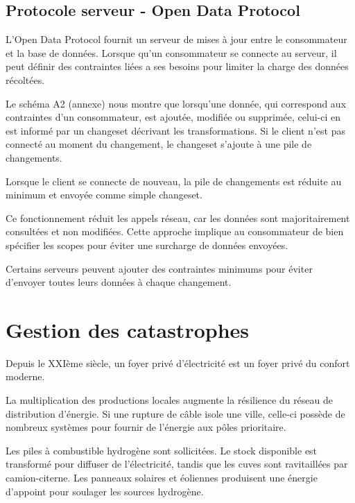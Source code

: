 \subsection{Protocole serveur - Open Data Protocol}

L'Open Data Protocol fournit un serveur de mises à jour entre le consommateur et la base de données.
Lorsque qu'un consommateur se connecte au serveur, il peut définir des contraintes liées a ses besoins
pour limiter la charge des données récoltées.

Le schéma A2 (annexe) nous montre que lorsqu'une donnée, qui correspond aux contraintes d'un consommateur, est ajoutée, modifiée ou supprimée,
celui-ci en est informé par un changeset décrivant les transformations.
Si le client n'est pas connecté au moment du changement, le changeset s'ajoute à une pile
de changements.

Lorsque le client se connecte de nouveau, la pile de changements est réduite au minimum et envoyée
comme simple changeset.

Ce fonctionnement réduit les appels réseau, car les données sont majoritairement consultées et non modifiées.
Cette approche implique au consommateur de bien spécifier les scopes pour éviter une surcharge de données
envoyées.

Certains serveurs peuvent ajouter des contraintes minimums pour éviter d'envoyer toutes leurs données
à chaque changement.



\section{Gestion des catastrophes}

Depuis le XXIème siècle, un foyer privé d'électricité est un foyer privé du confort moderne.

La multiplication des productions locales augmente la résilience du réseau de distribution d'énergie.
Si une rupture de câble isole une ville, celle-ci possède de nombreux systèmes pour fournir
de l'énergie aux pôles prioritaire.

Les piles à combustible hydrogène sont sollicitées. Le stock disponible est transformé pour diffuser de l'électricité,
tandis que les cuves sont ravitaillées par camion-citerne.
Les panneaux solaires et éoliennes produisent une énergie d'appoint pour soulager les sources hydrogène.

